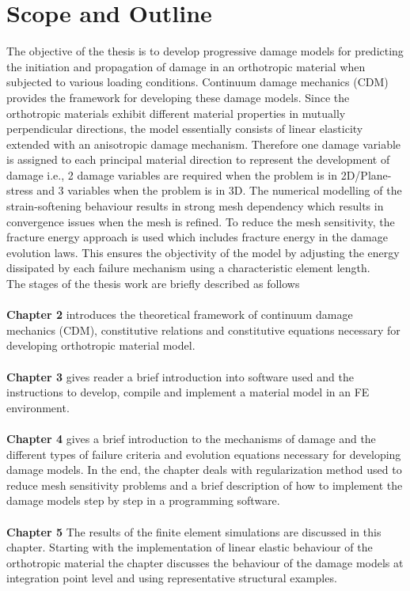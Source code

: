 \documentclass[12pt,twoside]{report}
\begin{document}
\section{Scope and Outline}
\indent\indent\indent  The objective of the thesis is to develop progressive damage models for predicting the initiation and propagation of damage in an orthotropic material when subjected to various loading conditions. Continuum damage mechanics (CDM) provides the framework for developing these damage models. Since the orthotropic materials exhibit different material properties in mutually perpendicular directions, the model essentially consists of linear elasticity extended with an anisotropic damage mechanism. Therefore one damage variable is assigned to each principal material direction to represent the development of damage i.e., 2 damage variables are required when the problem is in 2D/Plane-stress  and 3 variables when the problem is in 3D. The numerical modelling of the strain-softening behaviour results in strong mesh dependency which results in convergence issues when the mesh is refined. To reduce the mesh sensitivity, the fracture energy approach is used which includes fracture energy in the damage evolution laws. This ensures the objectivity of the model by adjusting the energy dissipated by each failure mechanism using a characteristic element length.\\
The stages of the thesis work are briefly described as follows\\\\
\textbf{Chapter 2} introduces the theoretical framework of continuum damage mechanics (CDM), constitutive relations and constitutive equations necessary for developing orthotropic material model. \\\\
\textbf{Chapter 3} gives reader a brief introduction into software used and the instructions to develop, compile and implement a material model in an FE environment. \\\\
\textbf{Chapter 4} gives a brief introduction to the mechanisms of damage and the different types of failure criteria and evolution equations necessary for developing damage models. In the end, the chapter deals with regularization method used to reduce mesh sensitivity problems and a brief description of how to implement the damage models step by step in a programming software. \\\\
\textbf{Chapter 5} The results of the finite element simulations are discussed in this chapter. Starting with the implementation of linear elastic behaviour of the orthotropic material the chapter discusses the behaviour of the damage models at integration point level and using representative structural examples.  
\end{document}
